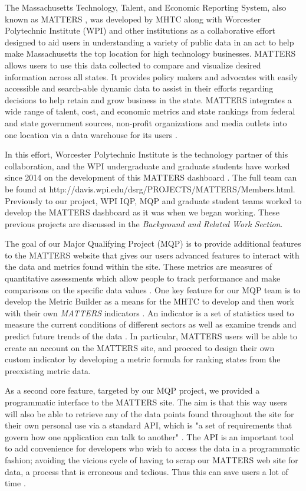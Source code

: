 	The Massachusetts Technology, Talent, and Economic Reporting System, also known as MATTERS \cite{matters}, 
	was developed by MHTC along with Worcester Polytechnic Institute (WPI) and other 
	institutions as a collaborative effort designed to aid users in understanding a 
	variety of public data in an act to help make Massachusetts the top location 
	for high technology businesses. MATTERS allows users to use this data collected to compare and visualize desired information across all states. 
	It provides policy makers and advocates with easily accessible and search-able 
	dynamic data to assist in their efforts regarding decisions to help  retain and 
	grow business in the state. MATTERS integrates a wide 
	range of talent, cost, and economic metrics and state rankings from federal and 
	state government sources, non-profit organizations and media outlets into one 
	location via a data warehouse for its users \cite{about}. 

	In this effort, Worcester Polytechnic Institute is the technology partner of this collaboration, and the WPI undergraduate and graduate students have worked since 2014 on the development of this MATTERS dashboard \cite{wpi}. The full team can be found at http://davis.wpi.edu/dsrg/PROJECTS/MATTERS/Members.html. Previously to our project, WPI IQP, MQP and graduate student teams worked to 
	develop the MATTERS dashboard as it was when we began working. These previous projects are discussed 
	in the \textit{Background and Related Work Section}. 
	
	The goal of our 
	Major Qualifying Project (MQP) is to provide additional features to the MATTERS 
	website that gives our users advanced features to interact with the data and 
	metrics found within the site. These metrics are measures of quantitative assessments which allow people to track performance and make comparisons on the specific data values \cite{metrics}. One key feature for our MQP team is to develop the Metric Builder 
	as a means for the MHTC to develop and then work with their own 
	\textit{MATTERS} indicators \cite{indicator}. An indicator is a set of statistics used to measure the current conditions of different sectors as well as examine trends and predict future trends of the data \cite{indicator}. In particular, MATTERS users will be able to 
	create an account on the MATTERS site, and proceed to design their own custom indicator by developing a metric formula for ranking states from the preexisting metric data. 
	
	As a second core feature, targeted by our MQP project, we provided a programmatic interface to the MATTERS site. The aim is that this way users will 
	also be able to retrieve any of the data points found throughout the site 
	for their own personal use via a standard API, which is "a set of requirements that govern how one application can talk to another" \cite{apidef}. The API is an important tool to add convenience for developers who wish to access the data in a programmatic fashion; avoiding the vicious cycle of having to scrap our MATTERS web site for data, a process that is erroneous and tedious. Thus this can save users a lot of time \cite{apidef}.
	
